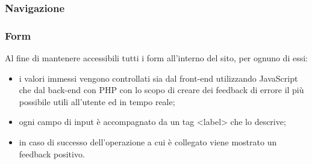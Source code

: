 \subsubsection{Navigazione}

\subsubsection{Form}
Al fine di mantenere accessibili tutti i form all'interno del sito, per ognuno di essi:
\begin{itemize}
    \item i valori immessi vengono controllati sia dal front-end utilizzando JavaScript che dal back-end con PHP con lo scopo di creare dei feedback di errore il più possibile utili all'utente ed in tempo reale;
    \item ogni campo di input è accompagnato da un tag <label> che lo descrive;
    \item in caso di successo dell'operazione a cui è collegato viene mostrato un feedback positivo.
\end{itemize}
